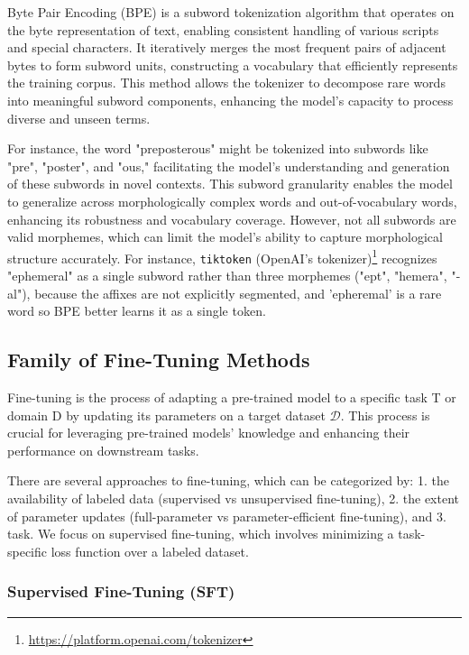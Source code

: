 \documentclass{article}
\newcounter{para}
\begin{document}
Byte Pair Encoding (BPE) is a subword tokenization algorithm that operates on the byte representation of text, enabling consistent handling of various scripts and special characters. It iteratively merges the most frequent pairs of adjacent bytes to form subword units, constructing a vocabulary that efficiently represents the training corpus. This method allows the tokenizer to decompose rare words into meaningful subword components, enhancing the model's capacity to process diverse and unseen terms.

For instance, the word "preposterous" might be tokenized into subwords like "pre", "poster", and "ous," facilitating the model's understanding and generation of these subwords in novel contexts. This subword granularity enables the model to generalize across morphologically complex words and out-of-vocabulary words, enhancing its robustness and vocabulary coverage. However, not all subwords are valid morphemes, which can limit the model's ability to capture morphological structure accurately. For instance, \verb|tiktoken| (OpenAI's tokenizer)\footnote{\href{https://platform.openai.com/tokenizer}{https://platform.openai.com/tokenizer}} recognizes "ephemeral" as a single subword rather than three morphemes ("ept", "hemera", "-al"), because the affixes are not explicitly segmented, and 'epheremal' is a rare word so BPE better learns it as a single token.

\subsection{Family of Fine-Tuning Methods}
Fine-tuning is the process of adapting a pre-trained model to a specific task T or domain D by updating its parameters on a target dataset \(\mathcal{D}\). This process is crucial for leveraging pre-trained models' knowledge and enhancing their performance on downstream tasks.

There are several approaches to fine-tuning, which can be categorized by: 1. the availability of labeled data (supervised vs unsupervised fine-tuning), 2. the extent of parameter updates (full-parameter vs parameter-efficient fine-tuning), and 3. task. We focus on supervised fine-tuning, which involves minimizing a task-specific loss function over a labeled dataset.

\subsubsection{Supervised Fine-Tuning (SFT)}\label{sec:pre-sft}
\end{document}
